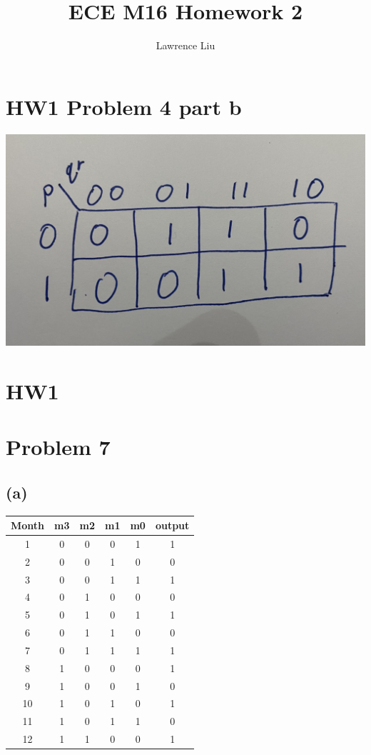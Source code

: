\documentclass[12pt]{article}
\title{ECE M16 Homework 2}
\author{Lawrence Liu}
\begin{document}
\maketitle
\section*{HW1 Problem  4 part b}
\includegraphics[scale=0.15]{../HW1/Kmap.jpg}
\section*{HW1}
\section*{Problem 7}
\subsection*{(a)}
\begin{center}
    \begin{tabular}{|c|c|c|c|c|c|}
        Month & m3 & m2 & m1 & m0 & output \\
        \hline
        1 & 0 & 0 & 0 & 1 & 1 \\
        \hline
        2 & 0 & 0 & 1 & 0 & 0 \\
        \hline
        3 & 0 & 0 & 1 & 1 & 1 \\
        \hline
        4 & 0 & 1 & 0 & 0 & 0 \\
        \hline
        5 & 0 & 1 & 0 & 1 & 1 \\
        \hline
        6 & 0 & 1 & 1 & 0 & 0 \\
        \hline
        7 & 0 & 1 & 1 & 1 & 1 \\
        \hline
        8 & 1 & 0 & 0 & 0 & 1 \\
        \hline
        9 & 1 & 0 & 0 & 1 & 0 \\
        \hline
        10 & 1 & 0 & 1 & 0 & 1 \\
        \hline
        11 & 1 & 0 & 1 & 1 & 0 \\
        \hline
        12 & 1 & 1 & 0 & 0 & 1 \\
        \hline
    \end{tabular}
\end{center}
\end{document}
